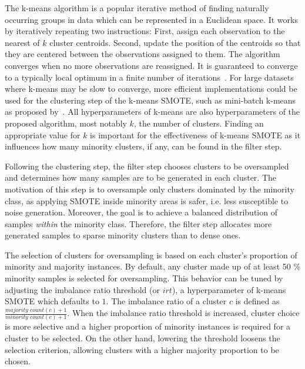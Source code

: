 \documentclass[sort&compress]{elsarticle}
\begin{document}

	The k-means algorithm is a popular iterative method of finding naturally occurring groups in data which can be represented in a Euclidean space. It works by iteratively repeating two instructions: First, assign each observation to the nearest of $k$ cluster centroids. Second, update the position of the centroids so that they are centered between the observations assigned to them. The algorithm converges when no more observations are reassigned. It is guaranteed to converge to a typically local optimum in a finite number of iterations~\citep{MacQueen.1967}. For large datasets where k-means may be slow to converge, more efficient implementations could be used for the clustering step of the k-means \ac{SMOTE}, such as mini-batch k-means as proposed by~\citep{Sculley.2010}. All hyperparameters of k-means are also hyperparameters of the proposed algorithm, most notably $k$, the number of clusters. Finding an appropriate value for $k$ is important for the effectiveness of k-means \ac{SMOTE} as it influences how many minority clusters, if any, can be found in the filter step.

	Following the clustering step, the filter step chooses clusters to be oversampled and determines how many samples are to be generated in each cluster. The motivation of this step is to oversample only clusters dominated by the minority class, as applying \ac{SMOTE} inside minority areas is safer, i.e. less susceptible to noise generation. Moreover, the goal is to achieve a balanced distribution of samples \textit{within} the minority class. Therefore, the filter step allocates more generated samples to sparse minority clusters than to dense ones.
	
	The selection of clusters for oversampling is based on each cluster's proportion of minority and majority instances. By default, any cluster made up of at least 50 \% minority samples is selected for oversampling. This behavior can be tuned by adjusting the imbalance ratio threshold (or $irt$), a hyperparameter of k-means \ac{SMOTE} which defaults to $1$. The imbalance ratio of a cluster $c$ is defined as $\frac{\textit{majority count}(c) + 1}{\textit{minority count}(c) + 1}$. When the imbalance ratio threshold is increased, cluster choice is more selective and a higher proportion of minority instances is required for a cluster to be selected. On the other hand, lowering the threshold loosens the selection criterion, allowing clusters with a higher majority proportion to be chosen.
\end{document}
